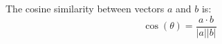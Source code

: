 \documentclass{article}
\begin{document}
The cosine similarity between vectors $a$ and $b$ is:
$$ \cos(\theta) = \frac{a \cdot b}{|a||b|} $$
\end{document}
